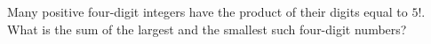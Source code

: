 Many positive four-digit integers have the product of their digits equal to $5!$. What is the sum of the largest and the smallest such four-digit numbers?
